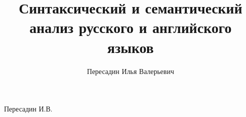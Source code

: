 \documentclass[]{itmo-student-thesis}
\begin{document}
\title{Синтаксический и семантический анализ русского и английского языков}
\author{Пересадин Илья Валерьевич}{Пересадин И.В.}



\tableofcontents



%
%
%

\startconclusionpage

\printmainbibliography
\end{document}
